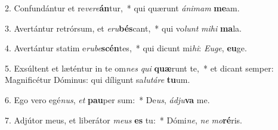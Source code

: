 2. Confundántur et re\textit{ve}\textit{re}\textbf{án}tur,~*  qui quærunt \textit{á}\textit{ni}\textit{mam} \textbf{me}am.\

3. Avertántur retrórsum, et \textit{e}\textit{ru}\textbf{bés}cant,~*  qui vo\textit{lunt} \textit{mi}\textit{hi} \textbf{ma}la.\

4. Avertántur statim e\textit{ru}\textit{be}\textbf{scén}tes,~*  qui dicunt mi\textit{hi}: \textit{Eu}\textit{ge}, \textbf{eu}ge.\

5. Exsúltent et læténtur in te om\textit{nes} \textit{qui} \textbf{quæ}runt te,~*  et dicant semper: Magnificétur Dóminus: qui díligunt sa\textit{lu}\textit{tá}\textit{re} \textbf{tu}um.\

6. Ego vero egé\textit{nus}, \textit{et} \textbf{pau}per sum:~*  De\textit{us}, \textit{ád}\textit{ju}\textbf{va} me.\

7. Adjútor meus, et liberátor \textit{me}\textit{us} \textbf{es} tu:~*  Dómi\textit{ne}, \textit{ne} \textit{mo}\textbf{ré}ris.\

